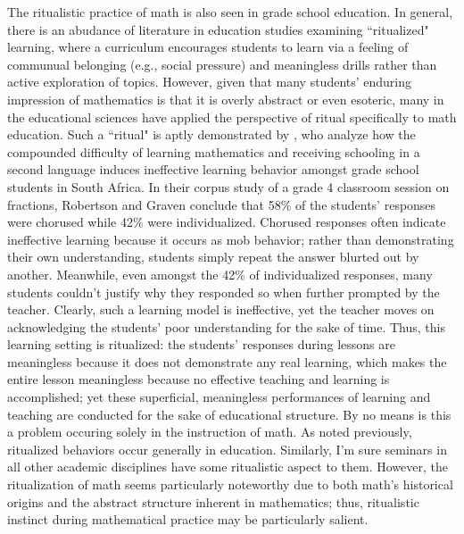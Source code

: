\documentclass[12pt, letterpaper]{article}
\begin{document}
The ritualistic practice of math is also seen in grade school education. 
In general, there is an abudance of literature in education studies examining ``ritualized" learning, where a curriculum encourages students to learn via a feeling of communual belonging (e.g., social pressure) and meaningless drills rather than active exploration of topics.  
However, given that many students' enduring impression of mathematics is that it is overly abstract or even esoteric, many in the educational sciences have applied the perspective of ritual specifically to math education. 
Such a ``ritual" is aptly demonstrated by \cite{robertson2019exploratory}, who analyze how the compounded difficulty of learning mathematics and receiving schooling in a second language induces ineffective learning behavior amongst grade school students in South Africa. 
In their corpus study of a grade 4 classroom session on fractions, Robertson and Graven conclude that 58\% of the students' responses were chorused while 42\% were individualized. 
Chorused responses often indicate ineffective learning because it occurs as mob behavior; 
rather than demonstrating their own understanding, students simply repeat the answer blurted out by another. 
Meanwhile, even amongst the 42\% of individualized responses, many students couldn't justify why they responded so when further prompted by the teacher. 
Clearly, such a learning model is ineffective, yet the teacher moves on acknowledging the students' poor understanding for the sake of time. 
Thus, this learning setting is ritualized: 
the students' responses during lessons are meaningless because it does not demonstrate any real learning, which makes the entire lesson meaningless because no effective teaching and learning is accomplished;
yet these superficial, meaningless performances of learning and teaching are conducted for the sake of educational structure. 
By no means is this a problem occuring solely in the instruction of math.
As noted previously, ritualized behaviors occur generally in education. 
Similarly, I'm sure seminars in all other academic disciplines have some ritualistic aspect to them. 
However, the ritualization of math seems particularly noteworthy due to both math's historical origins and the abstract structure inherent in mathematics;
thus, ritualistic instinct during mathematical practice may be particularly salient. 
\end{document}
